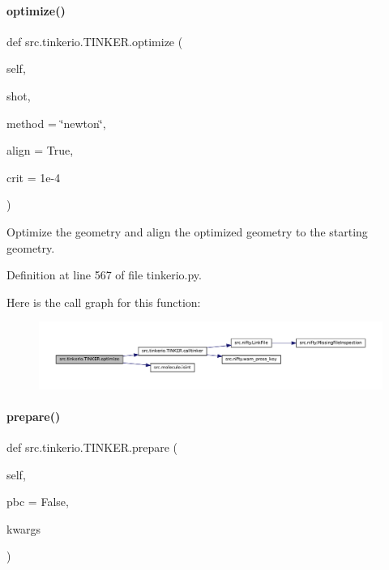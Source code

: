 \paragraph{\texorpdfstring{optimize()}{optimize()}}
{\footnotesize\ttfamily def src.\+tinkerio.\+T\+I\+N\+K\+E\+R.\+optimize (\begin{DoxyParamCaption}\item[{}]{self,  }\item[{}]{shot,  }\item[{}]{method = {\ttfamily \char`\"{}newton\char`\"{}},  }\item[{}]{align = {\ttfamily True},  }\item[{}]{crit = {\ttfamily 1e-\/4} }\end{DoxyParamCaption})}



Optimize the geometry and align the optimized geometry to the starting geometry. 



Definition at line 567 of file tinkerio.\+py.

Here is the call graph for this function\+:
\nopagebreak
\begin{figure}[H]
\begin{center}
\leavevmode
\includegraphics[width=350pt]{classsrc_1_1tinkerio_1_1TINKER_a925601bd948f7a34dd0a229da9b16f0a_cgraph}
\end{center}
\end{figure}
\mbox{\label{classsrc_1_1tinkerio_1_1TINKER_ae792345131bcdde1062bec5ab20ff7ea}} 
\paragraph{\texorpdfstring{prepare()}{prepare()}}
{\footnotesize\ttfamily def src.\+tinkerio.\+T\+I\+N\+K\+E\+R.\+prepare (\begin{DoxyParamCaption}\item[{}]{self,  }\item[{}]{pbc = {\ttfamily False},  }\item[{}]{kwargs }\end{DoxyParamCaption})}



